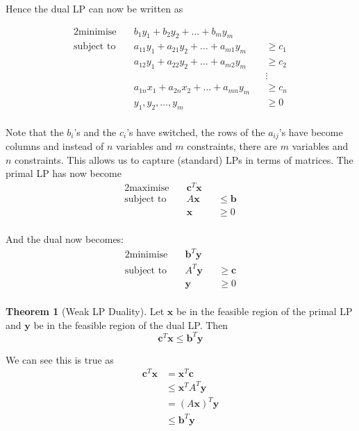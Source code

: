 \documentclass{article}
\theoremstyle{plain}
\theoremstyle{definition}
\newtheorem{thm}{Theorem}
\begin{document}
        Hence the dual LP can now be written as 

        \begin{alignat*}{2}
        \text{minimise} &\quad b_1 y_1 + b_2 y_2 + \ldots + b_m y_m  && \\
        \text{subject to} &\quad a_{11}y_1 + a_{21}y_2 + \ldots + a_{m1}y_m &&\geq c_1 \\
        &\quad a_{12}y_1 + a_{22}y_2 + \ldots + a_{m2}y_m &&\geq c_2 \\
        &    &&  \vdots \\ 
        &\quad a_{1n}x_1 + a_{2n}x_2 + \ldots + a_{mn}y_m &&\geq c_n \\
        &\quad y_1,y_2,\ldots,y_m &&\geq 0 \\
        \end{alignat*}

        Note that the $b_i$'s and the $c_i$'s have switched, the rows of the $a_{ij}$'s have become columns and instead of $n$ variables and $m$ constraints, there are $m$ variables and $n$ constraints. This allows us to capture (standard) LPs in terms of matrices. The primal LP has now become
\begin{alignat*}{2}
        \text{maximise} &\quad \mathbf{c}^T \mathbf{x}  && \\
        \text{subject to} &\quad A \mathbf{x} &&\leq \mathbf{b} \\
        &\quad \mathbf{x} &&\geq 0 \\
        \end{alignat*}
        
        And the dual now becomes:
        \begin{alignat*}{2}
        \text{minimise} &\quad \mathbf{b}^T \mathbf{y}  && \\
        \text{subject to} &\quad A^T \mathbf{y} &&\geq \mathbf{c} \\
        &\quad \mathbf{y} &&\geq 0 \\
        \end{alignat*}

        \begin{thm}[Weak LP Duality]
            Let $\mathbf{x}$ be in the feasible region of the primal LP and $\mathbf{y}$ be in the feasible region of the dual LP. Then
            \[ \mathbf{c}^T \mathbf{x} \leq \mathbf{b}^T \mathbf{y} \]
        \end{thm}

        We can see this is true as
        \begin{align*}
            \mathbf{c}^T \mathbf{x} &= \mathbf{x}^T \mathbf{c} \\
            &\leq \mathbf{x}^T A^T \mathbf{y} \\
            &= (A \mathbf{x})^T \mathbf{y} \\
            &\leq \mathbf{b}^T \mathbf{y}
        \end{align*}
\end{document}
